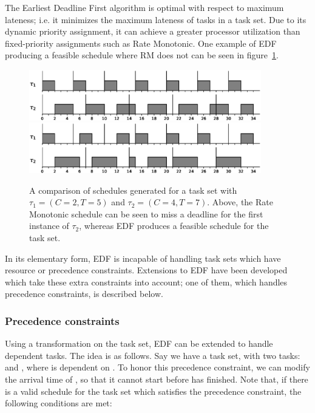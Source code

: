 The Earliest Deadline First algorithm is optimal with respect to maximum lateness; i.e. it minimizes the maximum lateness of tasks in a task set. Due to its dynamic priority assignment, it can achieve a greater processor utilization than fixed-priority assignments such as Rate Monotonic. One example of EDF producing a feasible schedule where RM does not can be seen in figure~\ref{fig:edfrmfeasible}.

\begin{figure}[htpb]
    \centering
    \includegraphics[width=0.9\textwidth]{figures/rmfail.eps}
    \includegraphics[width=0.9\textwidth]{figures/edfsucc.eps}
    \caption{A comparison of schedules generated for a task set with $\tau_1 = (C = 2, T = 5)$ and $\tau_2 = (C = 4, T = 7)$. Above, the Rate Monotonic schedule can be seen to miss a deadline for the first instance of $\tau_2$, whereas EDF produces a feasible schedule for the task set.}
    \label{fig:edfrmfeasible}
\end{figure}

In its elementary form, EDF is incapable of handling task sets which have resource or precedence constraints. Extensions to EDF have been developed which take these extra constraints into account; one of them, which handles precedence constraints, is described below.

\subsubsection{Precedence constraints}
Using a transformation on the task set, EDF can be extended to handle dependent tasks\cite{Chetto1990}. The idea is as follows. Say we have a task set, with two tasks:  and , where  is dependent on . To honor this precedence constraint, we can modify the arrival time of , so that it cannot start before  has finished. Note that, if there is a valid schedule for the task set which satisfies the precedence constraint, the following conditions are met:

